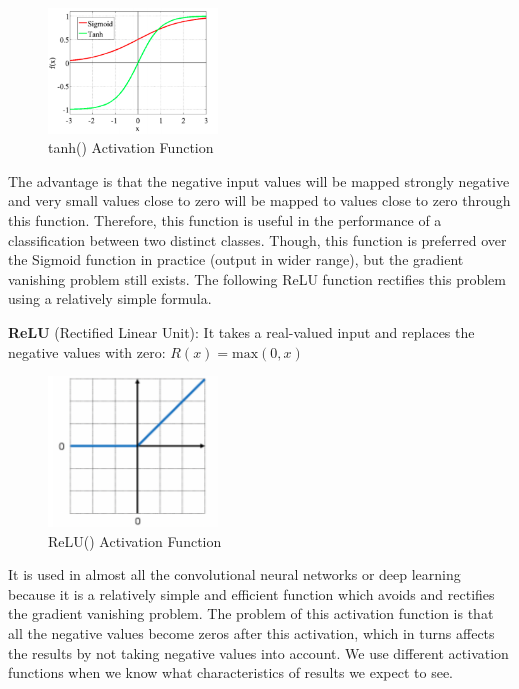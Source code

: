 \documentclass[a4paper,11pt,oneside]{book}
\begin{document}
\begin{figure}[!h]
	\centering
	\includegraphics[width=0.4\textwidth]{figures/tanh}
	\caption{tanh() Activation Function}
	\label{fourthfig}
\end{figure}

The advantage is that the negative input values will be mapped
strongly negative and very small values close to zero will be mapped to values close to zero through this
function. Therefore, this function is useful in the performance of a classification between two distinct classes.
Though, this function is preferred over the Sigmoid function in practice (output in wider range), but the gradient vanishing
problem still exists. The following ReLU function rectifies this problem
using a relatively simple formula.\newline\newline

\textbf{ReLU} (Rectified Linear Unit): It takes a real-valued input and replaces the negative values with zero:
\newline\newline
$R(x)= \text{max}(0,x)$
\begin{figure}[!h]
	\centering
	\includegraphics[width=0.4\textwidth]{figures/Relu}
	\caption{ReLU() Activation Function}
	\label{fifthfig}
\end{figure}
\newline\newline It is used in almost all the convolutional neural networks or deep learning because it is a relatively simple and efficient
function which avoids and rectifies the gradient vanishing problem.
The problem of this activation function is that all the negative
values become zeros after this activation, which in turns affects the
results by not taking negative values into account.
\newline\newline We use different activation functions when we know what characteristics of results we expect to see.
\end{document}
